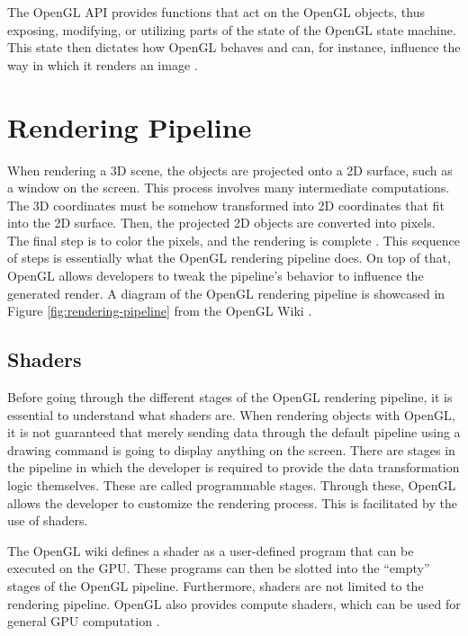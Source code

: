 \documentclass[
  digital,     %
  oneside,     %
  nosansbold,  %
  nocolorbold, %
  lof,         %
  lot,         %
]{fithesis4}
\begin{document}
The OpenGL API provides functions that act on the OpenGL objects, thus exposing, modifying, or
utilizing parts of the state of the OpenGL state machine. This state then dictates how OpenGL
behaves and can, for instance, influence the way in which it renders an image \cite{openglwiki-statemachine}.

\section{Rendering Pipeline}
When rendering a 3D scene, the objects are projected onto a 2D surface, such as a window on the
screen. This process involves many intermediate computations. The 3D coordinates must be
somehow transformed into 2D coordinates that fit into the 2D surface. Then, the projected 2D
objects are converted into pixels. The final step is to color the pixels,
and the rendering is complete \cite{learnopengl-triangle}.
This sequence of steps is essentially what the OpenGL rendering pipeline does.
On top of that, OpenGL allows developers to tweak the pipeline's behavior to influence the generated render.
A diagram of the OpenGL rendering pipeline is showcased in Figure \ref{fig:rendering-pipeline} from
the OpenGL Wiki \cite{openglwiki-rendering-pipeline}.

\subsection{Shaders}
Before going through the different stages of the OpenGL rendering pipeline, it is essential to
understand what shaders are. When rendering objects with OpenGL, it is not guaranteed that
merely sending data through the default pipeline using a drawing command is going to display
anything on the screen. There are stages in the pipeline in which the developer is required to provide the data transformation
logic themselves. These are called programmable stages. Through these, OpenGL allows
the developer to customize the rendering process. This is facilitated by the use of shaders.

The OpenGL wiki defines a shader as a user-defined program that can be executed on the GPU.
These programs can then be slotted into the \enquote{empty} stages of the OpenGL pipeline.
Furthermore, shaders are not limited to the rendering pipeline.
OpenGL also provides compute shaders, which can be used for general GPU computation \cite{openglwiki-shader}.
\end{document}
